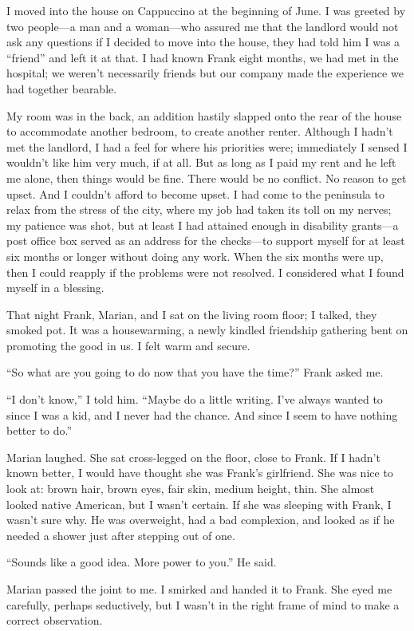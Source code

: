 I moved into the house on Cappuccino at the beginning of June. I was
greeted by two people---a man and a woman---who assured me that the
landlord would not ask any questions if I decided to move into the
house, they had told him I was a ``friend'' and left it at that. I had
known Frank eight months, we had met in the hospital; we weren't
necessarily friends but our company made the experience we had together
bearable.

My room was in the back, an addition hastily slapped onto the rear of
the house to accommodate another bedroom, to create another renter.
Although I hadn't met the landlord, I had a feel for where his
priorities were; immediately I sensed I wouldn't like him very much, if
at all. But as long as I paid my rent and he left me alone, then things
would be fine. There would be no conflict. No reason to get upset. And I
couldn't afford to become upset. I had come to the peninsula to relax
from the stress of the city, where my job had taken its toll on my
nerves; my patience was shot, but at least I had attained enough in
disability grants---a post office box served as an address for the
checks---to support myself for at least six months or longer without
doing any work. When the six months were up, then I could reapply if the
problems were not resolved. I considered what I found myself in a
blessing.

That night Frank, Marian, and I sat on the living room floor; I talked,
they smoked pot. It was a housewarming, a newly kindled friendship
gathering bent on promoting the good in us. I felt warm and secure.

``So what are you going to do now that you have the time?'' Frank asked
me.

``I don't know,'' I told him. ``Maybe do a little writing. I've always
wanted to since I was a kid, and I never had the chance. And since I
seem to have nothing better to do.''

Marian laughed. She sat cross-legged on the floor, close to Frank. If I
hadn't known better, I would have thought she was Frank's girlfriend.
She was nice to look at: brown hair, brown eyes, fair skin, medium
height, thin. She almost looked native American, but I wasn't certain.
If she was sleeping with Frank, I wasn't sure why. He was overweight,
had a bad complexion, and looked as if he needed a shower just after
stepping out of one.

``Sounds like a good idea. More power to you.'' He said.

Marian passed the joint to me. I smirked and handed it to Frank. She
eyed me carefully, perhaps seductively, but I wasn't in the right frame
of mind to make a correct observation.


